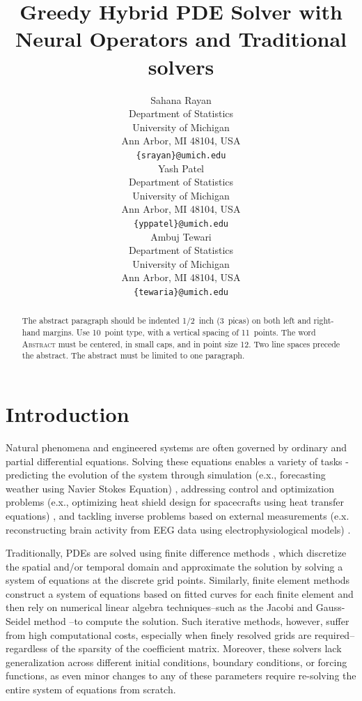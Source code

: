 \documentclass{article} %
\title{Greedy Hybrid PDE Solver with \\ Neural Operators and Traditional solvers}
\author{Sahana Rayan \\
Department of Statistics\\
University of Michigan\\
Ann Arbor, MI 48104, USA \\
\texttt{\{srayan\}@umich.edu} \\
\And
Yash Patel \\
Department of Statistics\\
University of Michigan\\
Ann Arbor, MI 48104, USA \\
\texttt{\{yppatel\}@umich.edu} \\
\And
Ambuj Tewari \\
Department of Statistics\\
University of Michigan\\
Ann Arbor, MI 48104, USA \\
\texttt{\{tewaria\}@umich.edu} \\
}
\begin{document}
\maketitle

\begin{abstract}
The abstract paragraph should be indented 1/2~inch (3~picas) on both left and
right-hand margins. Use 10~point type, with a vertical spacing of 11~points.
The word \textsc{Abstract} must be centered, in small caps, and in point size 12. Two
line spaces precede the abstract. The abstract must be limited to one
paragraph.
\end{abstract}

\section{Introduction}

Natural phenomena and engineered systems are often governed by ordinary and partial differential equations. Solving these equations enables a variety of tasks - predicting the evolution of the system through simulation (e.x., forecasting weather using Navier Stokes Equation) \citep{kalnay2003atmospheric,bauer2015quiet,staniforth1991semi}, addressing control and optimization problems (e.x., optimizing heat shield design for spacecrafts using heat transfer equations) \citep{anderson1989hypersonic,troltzsch2010optimal}, and tackling inverse problems based on external measurements (e.x. reconstructing brain activity from EEG data using electrophysiological models) \citep{baillet2001electromagnetic,grech2008review}. 

Traditionally, PDEs are solved using finite difference methods \citep{smith1985numerical,leveque2007finite}, which discretize the spatial and/or temporal domain and approximate the solution by solving a system of equations at the discrete grid points. Similarly, finite element methods \citep{hughes2003finite,bathe2006finite,brenner2008mathematical} construct a system of equations based on fitted curves for each finite element and then rely on numerical linear algebra techniques--such as the Jacobi and Gauss-Seidel method \citep{saad2003iterative}--to compute the solution. Such iterative methods, however, suffer from high computational costs, especially when finely resolved grids are required--regardless of the sparsity of the coefficient matrix. Moreover, these solvers lack generalization across different initial conditions, boundary conditions, or forcing functions, as even minor changes to any of these parameters require re-solving the entire system of equations from scratch. 
\end{document}
